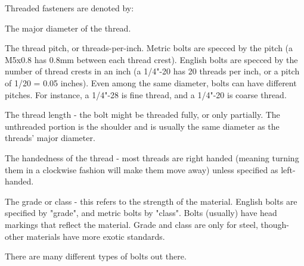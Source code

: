 \documentclass[10pt,letterpaper]{book}
\begin{document}
	Threaded fasteners are denoted by:
	\begin{asparaitem}
		\item The major diameter of the thread.
		\item The thread pitch, or threads-per-inch. Metric bolts are specced by the pitch (a M5x0.8 has 0.8mm between each thread crest). English bolts are specced by the number of thread crests in an inch (a 1/4"-20 has 20 threads per inch, or a pitch of 1/20 = 0.05 inches). Even among the same diameter, bolts can have different pitches. For instance, a 1/4"-28 is fine thread, and a 1/4"-20 is coarse thread.
		\item The thread length - the bolt might be threaded fully, or only partially. The unthreaded portion is the shoulder and is usually the same diameter as the threads' major diameter.
		\item The handedness of the thread - most threads are right handed (meaning turning them in a clockwise fashion will make them move away) unless specified as left-handed.
		\item The grade or class - this refers to the strength of the material. English bolts are specified by "grade", and metric bolts by "class". Bolts (usually) have head markings that reflect the material. Grade and class are only for steel, though- other materials have more exotic standards.
	\end{asparaitem}
	
	There are many different types of bolts out there.
	
\end{document}
